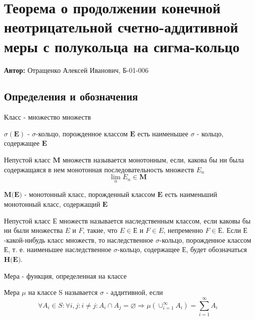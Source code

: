 

\section{Теорема о продолжении конечной неотрицательной счетно-аддитивной меры с полукольца на сигма-кольцо}

\textbf{Автор:} Отращенко Алексей Иванович, Б-01-006

\subsection{Определения и обозначения}

\begin{definition} Класс - множество множеств
	\end{definition}

\begin{definition} $\sigma(\textbf{E})$ - $\sigma$-кольцо, порожденное классом $\textbf{E}$ есть  наименьшее $\sigma$ - кольцо, содержащее $\textbf{E}$
	\end{definition}

\begin{definition} Непустой класс $\textbf{M}$ множеств называется монотонным, если, какова бы ни была содержащаяся в нем монотонная последовательность множеств  $E_n$
$$
	\lim_n E_n \in \textbf{M} 
$$
\end{definition}

\begin{definition} $\textbf{M(E)}$ - монотонный класс, порожденный классом $\textbf{E}$ есть  наименьший монотонный класс, содержащий $\textbf{E}$
	\end{definition}

\begin{definition} Непустой класс $\textbf{Е}$ множеств называется наследственным классом, если каковы бы ни были множества $E$ и $F$, такие, что $E \in \textbf{Е}$ и $F \in E$, непременно $F \in \textbf{Е}$. Если $\textbf{Е}$ -какой-нибудь класс множеств, то наследственное $\sigma$-кольцо, порожденное классом $\textbf{Е}$, т. е. наименьшее наследственное $\sigma$-кольцо, содержащее $\textbf{Е}$, будет обозначаться $\textbf{H(E)}$.
	\end{definition}

\begin{definition} Мера - функция, определенная на классе
	\end{definition}

\begin{definition} Мера $\mu$ на классе S называется $\sigma$ - аддитивной, если 
$$
\forall A_i \in S: \forall i, j : i \neq j : A_i \cap A_j = \varnothing \Rightarrow \mu(\cup_{i = 1}^{\infty} A_i) = \sum_{i = 1}^{\infty}A_i
$$
\end{definition}

